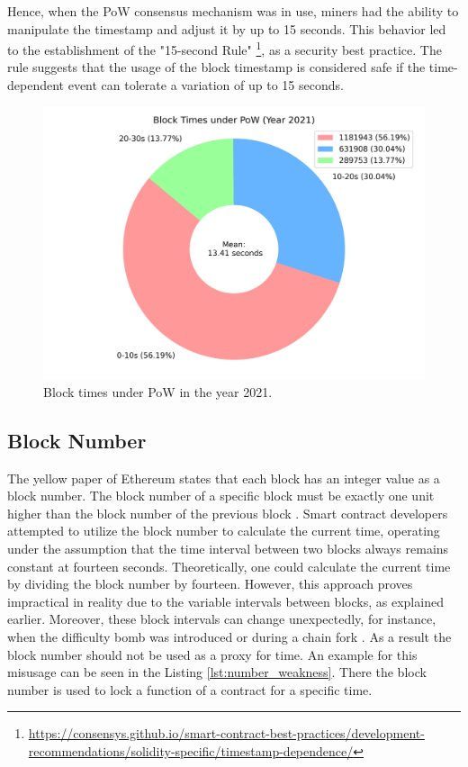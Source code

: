 Hence, when the PoW consensus mechanism was in use, miners had the ability to
manipulate the timestamp and adjust it by up to 15 seconds. This behavior led
to the establishment of the "15-second Rule"
\footnote{\url{https://consensys.github.io/smart-contract-best-practices/development-recommendations/solidity-specific/timestamp-dependence/}},
as a security best practice. The
rule suggests that the usage of the block timestamp is considered
safe if the time-dependent event can tolerate a variation of up to 15 seconds. 

\begin{figure}[H]
  \centering
  \includegraphics[width=1\textwidth]{block_time_analysis/pow_block_time_pie_chart.png}
  \caption{Block times under PoW in the year 2021.}
  \label{fig:block_time_analysis_pow}
\end{figure}

\subsection{Block Number}
The yellow paper of Ethereum states that each block has
an integer value as a block number. The block number
of a specific block must be exactly one unit higher than the block
number of the previous block \cite{ethyellowpaper2023}.
Smart contract developers attempted to utilize the block number to calculate
the current time, operating under the assumption that the time interval between
two blocks always remains constant at fourteen seconds. Theoretically, one could
calculate the current time by dividing the block number by fourteen.
However, this approach proves impractical in reality due to the variable
intervals between blocks, as explained earlier. Moreover, these block intervals
can change unexpectedly, for instance, when the difficulty bomb was introduced
or during a chain fork \cite{swc116}.
As a result the block number should not be used as a proxy for time.
An example for this misusage can be seen in the Listing \ref{lst:number_weakness}.
There the block number is used to lock a function of a contract for a specific time.

